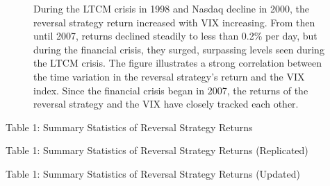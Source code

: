 \documentclass{article}
\newcommand*{\PathToOutput}{../output/}
\begin{document}
\begin{landscape}
\begin{figure}
    During the LTCM crisis in 1998 and  Nasdaq decline in 2000, the reversal strategy 
    return increased with VIX increasing. From then until 2007, returns declined steadily
    to less than 0.2\% per day, but during the financial crisis, they surged, surpassing 
    levels seen during the LTCM crisis. The figure illustrates a strong correlation 
    between the time variation in the reversal strategy's return and the VIX index. 
    Since the financial crisis began in 2007, the returns of the reversal strategy 
    and the VIX have closely tracked each other.
\end{figure}

\end{landscape}

\begin{table}
    \centering
    \caption*{Table 1:  Summary Statistics of Reversal Strategy Returns}

    
\end{table}


\begin{table}
    \centering
    \caption*{Table 1:  Summary Statistics of Reversal Strategy Returns (Replicated)}

    
\end{table}


\begin{table}
    \centering
    \caption*{Table 1:  Summary Statistics of Reversal Strategy Returns (Updated)}

    
\end{table}
\end{document}
